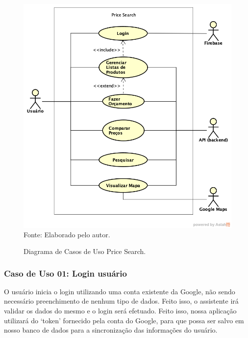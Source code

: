 \begin{figure}[!htb]
\centering
\caption{Diagrama de Casos de Uso Price Search.}
\includegraphics[width=\linewidth]{figuras/DiagramaCasosUsoPriceSearch.png}
{\footnotesize Fonte: Elaborado pelo autor.}
\end{figure}

\subsubsection{Caso de Uso 01: Login usuário}

O usuário inicia o login utilizando uma conta existente da Google, não sendo necessário preenchimento de nenhum tipo de dados. Feito isso, o assistente irá validar os dados do mesmo e o login será efetuado. Feito isso, nossa aplicação utilizará do ‘token’ fornecido pela conta do Google, para que possa ser salvo em nosso banco de dados para a sincronização das informações do usuário.

